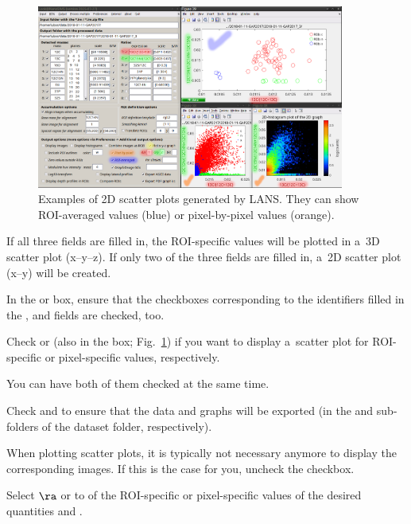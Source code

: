 \begin{figure}[!ht]
\centering
\includegraphics[width=0.9\textwidth]{figs3/LANS-scatter-plots}
\caption{\label{fig:scatter-plots}%
Examples of 2D scatter plots generated by LANS. They can show ROI-averaged values (blue) or pixel-by-pixel values (orange).}
\end{figure}
 

\bul If all three fields are filled in, the ROI-specific values will be plotted in a~3D scatter plot (x--y--z). If only two of the three fields are filled in, a~2D scatter plot (x--y) will be created.

\bul In the  or  box, ensure that the checkboxes corresponding to the identifiers filled in the ,  and  fields are checked, too. 

\s Check  or  (also in the  box; Fig.~\ref{fig:scatter-plots}) if you want to display a~scatter plot for ROI-specific or pixel-specific values, respectively.

\bul You can have both of them checked at the same time. 

\s Check  and  to ensure that the data and graphs will be exported (in the  and  sub-folders of the dataset folder, respectively).

\s When plotting scatter plots, it is typically not necessary anymore to display the corresponding images. If this is the case for you, uncheck the  checkbox.

\s Select  $\ra$  or  to  of the ROI-specific or pixel-specific values of the desired quantities and . 


